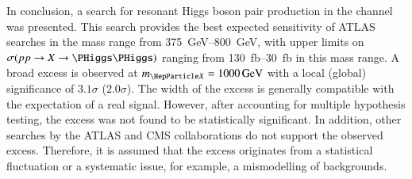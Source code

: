 %
%
%
%

In conclusion, a search for resonant Higgs boson pair production in the
\bbtautau channel was presented. This search provides the best expected
sensitivity of ATLAS searches in the mass range from \SIrange{375}{800}{\GeV},
with upper limits on $\sigma(\pp \to X \to \HH)$ ranging from
\SIrange{130}{30}{\femto\barn} in this mass range. A broad excess is observed at
$\mX = \SI{1000}{\GeV}$ with a local (global) significance of $3.1\sigma$
($2.0\sigma$). The width of the excess is generally compatible with the
expectation of a real signal. However, after accounting for multiple hypothesis
testing, the excess was not found to be statistically significant. In addition,
other searches by the ATLAS and CMS collaborations do not support the observed
excess. Therefore, it is assumed that the excess originates from a statistical
fluctuation or a systematic issue, for example, a mismodelling of backgrounds.


